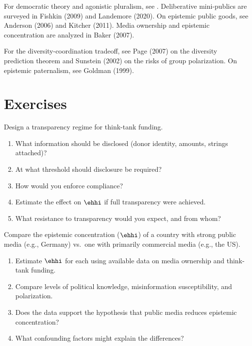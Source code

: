 For democratic theory and agonistic pluralism, see \textcite{mouffe2005}.
Deliberative mini-publics are surveyed in Fishkin (2009) and Landemore (2020).
On epistemic public goods, see Anderson (2006) and Kitcher (2011).
Media ownership and epistemic concentration are analyzed in Baker (2007).

For the diversity-coordination tradeoff, see Page (2007) on the diversity prediction theorem and Sunstein (2002) on the risks of group polarization.
On epistemic paternalism, see Goldman (1999).

\section{Exercises}

\begin{exercise}
Design a transparency regime for think-tank funding.
\begin{enumerate}[nosep]
  \item What information should be disclosed (donor identity, amounts, strings attached)?
  \item At what threshold should disclosure be required?
  \item How would you enforce compliance?
  \item Estimate the effect on $\ehhi$ if full transparency were achieved.
  \item What resistance to transparency would you expect, and from whom?
\end{enumerate}
\end{exercise}

\begin{exercise}
Compare the epistemic concentration ($\ehhi$) of a country with strong public media (e.g., Germany) vs.\ one with primarily commercial media (e.g., the US).
\begin{enumerate}[nosep]
  \item Estimate $\ehhi$ for each using available data on media ownership and think-tank funding.
  \item Compare levels of political knowledge, misinformation susceptibility, and polarization.
  \item Does the data support the hypothesis that public media reduces epistemic concentration?
  \item What confounding factors might explain the differences?
\end{enumerate}
\end{exercise}

